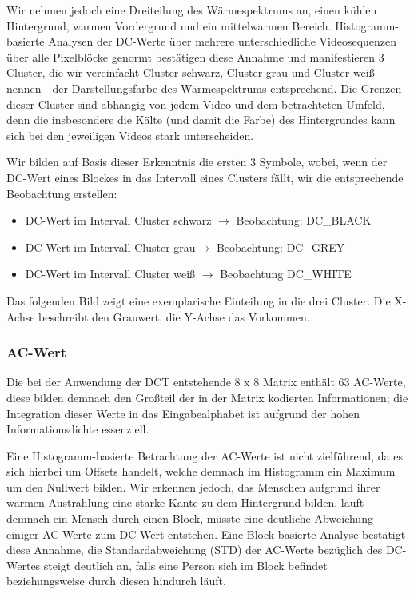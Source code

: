 Wir nehmen jedoch eine Dreiteilung des Wärmespektrums an, einen kühlen Hintergrund, warmen Vordergrund und ein mittelwarmen Bereich.
 Histogramm-basierte Analysen der DC-Werte über mehrere unterschiedliche Videosequenzen über alle Pixelblöcke genormt bestätigen diese Annahme und manifestieren 3 Cluster, die wir vereinfacht Cluster schwarz, Cluster grau und Cluster weiß nennen - der Darstellungsfarbe des Wärmespektrums entsprechend.
 Die Grenzen dieser Cluster sind abhängig von jedem Video und dem betrachteten Umfeld, denn die insbesondere die Kälte (und damit die Farbe) des Hintergrundes kann sich bei den jeweiligen Videos stark unterscheiden.


Wir bilden auf Basis dieser Erkenntnis die ersten 3 Symbole, wobei, wenn der DC-Wert eines Blockes in das Intervall eines Clusters fällt, wir die entsprechende Beobachtung erstellen:

\begin{itemize}
	\item DC-Wert im Intervall Cluster schwarz $\rightarrow$ Beobachtung: DC\_BLACK
	\item DC-Wert im Intervall Cluster grau$\rightarrow$ Beobachtung: DC\_GREY
	\item DC-Wert im Intervall Cluster weiß $\rightarrow$ Beobachtung DC\_WHITE
\end{itemize}

Das folgenden Bild zeigt eine exemplarische Einteilung in die drei Cluster.
 Die X-Achse beschreibt den Grauwert, die Y-Achse das Vorkommen.

\subsubsection{AC-Wert}

Die bei der Anwendung der DCT entstehende 8 x 8 Matrix enthält 63 AC-Werte, diese bilden demnach den Großteil der in der Matrix kodierten Informationen; die Integration dieser Werte in das Eingabealphabet ist aufgrund der hohen Informationsdichte essenziell.
 

Eine Histogramm-basierte Betrachtung der AC-Werte ist nicht zielführend, da es sich hierbei um Offsets handelt, welche demnach im Histogramm ein Maximum um den Nullwert bilden.
 Wir erkennen jedoch, das Menschen aufgrund ihrer warmen Austrahlung eine starke Kante zu dem Hintergrund bilden, läuft demnach ein Mensch durch einen Block, müsste eine deutliche Abweichung einiger AC-Werte zum DC-Wert entstehen.
 Eine Block-basierte Analyse bestätigt diese Annahme, die Standardabweichung (STD) der AC-Werte bezüglich des DC-Wertes steigt deutlich an, falls eine Person sich im Block befindet beziehungsweise durch diesen hindurch läuft.
 

